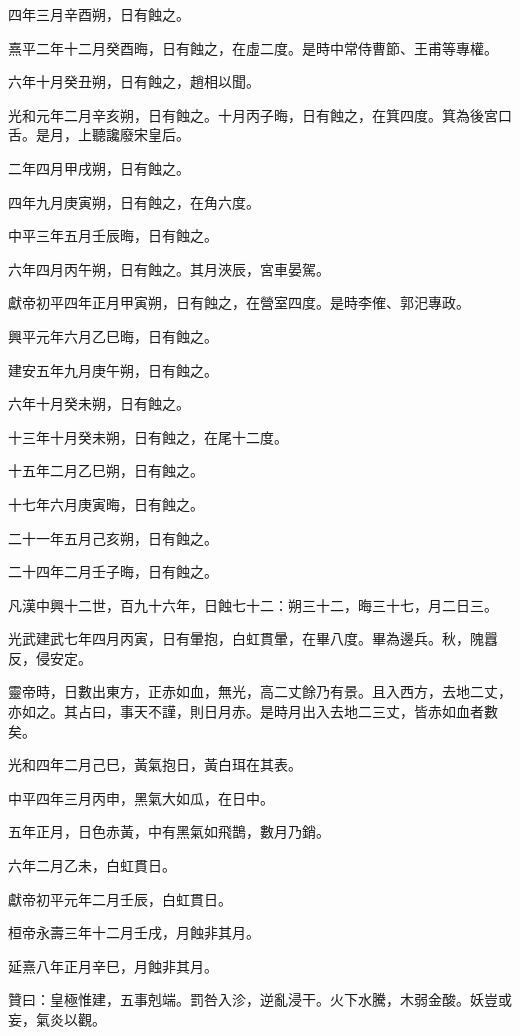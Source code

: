\begin{pinyinscope}
四年三月辛酉朔，日有蝕之。

熹平二年十二月癸酉晦，日有蝕之，在虛二度。是時中常侍曹節、王甫等專權。

六年十月癸丑朔，日有蝕之，趙相以聞。

光和元年二月辛亥朔，日有蝕之。十月丙子晦，日有蝕之，在箕四度。箕為後宮口舌。是月，上聽讒廢宋皇后。

二年四月甲戌朔，日有蝕之。

四年九月庚寅朔，日有蝕之，在角六度。

中平三年五月壬辰晦，日有蝕之。

六年四月丙午朔，日有蝕之。其月浹辰，宮車晏駕。

獻帝初平四年正月甲寅朔，日有蝕之，在營室四度。是時李傕、郭汜專政。

興平元年六月乙巳晦，日有蝕之。

建安五年九月庚午朔，日有蝕之。

六年十月癸未朔，日有蝕之。

十三年十月癸未朔，日有蝕之，在尾十二度。

十五年二月乙巳朔，日有蝕之。

十七年六月庚寅晦，日有蝕之。

二十一年五月己亥朔，日有蝕之。

二十四年二月壬子晦，日有蝕之。

凡漢中興十二世，百九十六年，日蝕七十二：朔三十二，晦三十七，月二日三。

光武建武七年四月丙寅，日有暈抱，白虹貫暈，在畢八度。畢為邊兵。秋，隗囂反，侵安定。

靈帝時，日數出東方，正赤如血，無光，高二丈餘乃有景。且入西方，去地二丈，亦如之。其占曰，事天不謹，則日月赤。是時月出入去地二三丈，皆赤如血者數矣。

光和四年二月己巳，黃氣抱日，黃白珥在其表。

中平四年三月丙申，黑氣大如瓜，在日中。

五年正月，日色赤黃，中有黑氣如飛鵲，數月乃銷。

六年二月乙未，白虹貫日。

獻帝初平元年二月壬辰，白虹貫日。

桓帝永壽三年十二月壬戌，月蝕非其月。

延熹八年正月辛巳，月蝕非其月。

贊曰：皇極惟建，五事剋端。罰咎入沴，逆亂浸干。火下水騰，木弱金酸。妖豈或妄，氣炎以觀。


\end{pinyinscope}